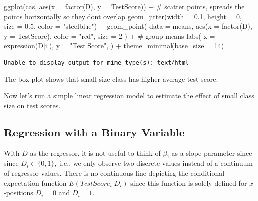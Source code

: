 \documentclass[
  12pt,
  a4paper,
]{scrbook}
\newenvironment{Shaded}{\begin{snugshade}}{\end{snugshade}}
\newcommand{\AttributeTok}[1]{\textcolor[rgb]{0.40,0.45,0.13}{#1}}
\newcommand{\CommentTok}[1]{\textcolor[rgb]{0.37,0.37,0.37}{#1}}
\newcommand{\DecValTok}[1]{\textcolor[rgb]{0.68,0.00,0.00}{#1}}
\newcommand{\FloatTok}[1]{\textcolor[rgb]{0.68,0.00,0.00}{#1}}
\newcommand{\FunctionTok}[1]{\textcolor[rgb]{0.28,0.35,0.67}{#1}}
\newcommand{\NormalTok}[1]{\textcolor[rgb]{0.00,0.23,0.31}{#1}}
\newcommand{\SpecialCharTok}[1]{\textcolor[rgb]{0.37,0.37,0.37}{#1}}
\newcommand{\StringTok}[1]{\textcolor[rgb]{0.13,0.47,0.30}{#1}}
\theoremstyle{plain}
\theoremstyle{definition}
\theoremstyle{remark}
\begin{document}
\begin{Shaded}
\begin{Highlighting}[]
\FunctionTok{ggplot}\NormalTok{(cas, }\FunctionTok{aes}\NormalTok{(}\AttributeTok{x =} \FunctionTok{factor}\NormalTok{(D), }\AttributeTok{y =}\NormalTok{ TestScore)) }\SpecialCharTok{+}
    \CommentTok{\# scatter points, spreads the points horizontally so they don\textquotesingle{}t overlap}
    \FunctionTok{geom\_jitter}\NormalTok{(}\AttributeTok{width =} \FloatTok{0.1}\NormalTok{, }\AttributeTok{height =} \DecValTok{0}\NormalTok{, }\AttributeTok{size =} \FloatTok{0.5}\NormalTok{, }\AttributeTok{color =} \StringTok{"steelblue"}\NormalTok{) }\SpecialCharTok{+}
    \FunctionTok{geom\_point}\NormalTok{(}
        \AttributeTok{data =}\NormalTok{ means, }\FunctionTok{aes}\NormalTok{(}\AttributeTok{x =} \FunctionTok{factor}\NormalTok{(D), }\AttributeTok{y =}\NormalTok{ TestScore),}
        \AttributeTok{color =} \StringTok{"red"}\NormalTok{, }\AttributeTok{size =} \DecValTok{2}
\NormalTok{    ) }\SpecialCharTok{+} \CommentTok{\# group means}
    \FunctionTok{labs}\NormalTok{(}
        \AttributeTok{x =} \FunctionTok{expression}\NormalTok{(D[i]),}
        \AttributeTok{y =} \StringTok{"Test Score"}\NormalTok{,}
\NormalTok{    ) }\SpecialCharTok{+}
    \FunctionTok{theme\_minimal}\NormalTok{(}\AttributeTok{base\_size =} \DecValTok{14}\NormalTok{)}
\end{Highlighting}
\end{Shaded}

\begin{verbatim}
Unable to display output for mime type(s): text/html
\end{verbatim}

The box plot shows that small size class has higher average test score.

Now let's run a simple linear regression model to estimate the effect of
small class size on test scores.

\subsection{Regression with a Binary
Variable}\label{regression-with-a-binary-variable}

With \(D\) as the regressor, it is not useful to think of \(\beta_1\) as
a slope parameter since since \(D_i \in \{0,1\},\) i.e., we only observe
two discrete values instead of a continuum of regressor values. There is
no continuous line depicting the conditional expectation function
\(E(TestScore_i | D_i)\) since this function is solely defined for
\(x\)-positions \(D_i = 0\) and \(D_i = 1\).
\end{document}
